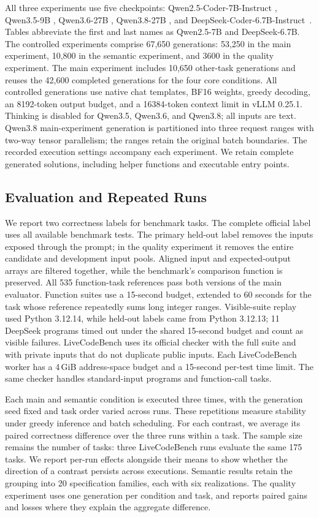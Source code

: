 \documentclass[acmsmall,screen,review,anonymous]{acmart}
\begin{document}
All three experiments use five checkpoints: Qwen2.5-Coder-7B-Instruct \citep{hui2024qwen25coder}, Qwen3.5-9B \citep{qwen35model}, Qwen3.6-27B \citep{qwen36}, Qwen3.8-27B \citep{qwen38model}, and DeepSeek-Coder-6.7B-Instruct~\citep{guo2024deepseek}.
Tables abbreviate the first and last names as Qwen2.5-7B and DeepSeek-6.7B.
The controlled experiments comprise 67,650 generations: 53,250 in the main experiment, 10,800 in the semantic experiment, and 3600 in the quality experiment.
The main experiment includes 10,650 other-task generations and reuses the 42,600 completed generations for the four core conditions.
All controlled generations use native chat templates, BF16 weights, greedy decoding, an 8192-token output budget, and a 16384-token context limit in vLLM 0.25.1.
Thinking is disabled for Qwen3.5, Qwen3.6, and Qwen3.8; all inputs are text.
Qwen3.8 main-experiment generation is partitioned into three request ranges with two-way tensor parallelism; the ranges retain the original batch boundaries.
The recorded execution settings accompany each experiment.
We retain complete generated solutions, including helper functions and executable entry points.

\subsection{Evaluation and Repeated Runs}

We report two correctness labels for benchmark tasks.
The complete official label uses all available benchmark tests.
The primary held-out label removes the inputs exposed through the prompt; in the quality experiment it removes the entire candidate and development input pools.
Aligned input and expected-output arrays are filtered together, while the benchmark's comparison function is preserved.
All 535 function-task references pass both versions of the main evaluator.
Function suites use a 15-second budget, extended to 60 seconds for the task whose reference repeatedly sums long integer ranges.
Visible-suite replay used Python 3.12.14, while held-out labels came from Python 3.12.13; 11 DeepSeek programs timed out under the shared 15-second budget and count as visible failures.
LiveCodeBench uses its official checker with the full suite and with private inputs that do not duplicate public inputs.
Each LiveCodeBench worker has a 4\,GiB address-space budget and a 15-second per-test time limit.
The same checker handles standard-input programs and function-call tasks.

Each main and semantic condition is executed three times, with the generation seed fixed and task order varied across runs.
These repetitions measure stability under greedy inference and batch scheduling.
For each contrast, we average its paired correctness difference over the three runs within a task.
The sample size remains the number of tasks: three LiveCodeBench runs evaluate the same 175 tasks.
We report per-run effects alongside their means to show whether the direction of a contrast persists across executions.
Semantic results retain the grouping into 20 specification families, each with six realizations.
The quality experiment uses one generation per condition and task, and reports paired gains and losses where they explain the aggregate difference.
\end{document}
